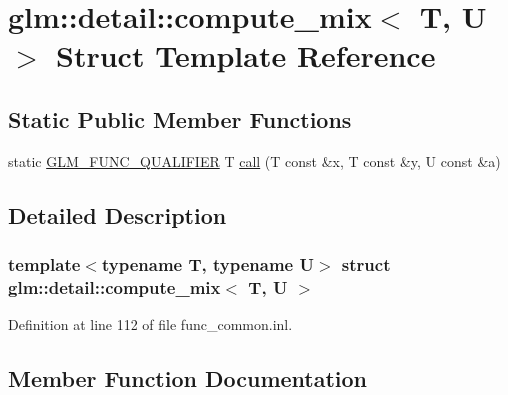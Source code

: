 \hypertarget{structglm_1_1detail_1_1compute__mix}{}\section{glm\+:\+:detail\+:\+:compute\+\_\+mix$<$ T, U $>$ Struct Template Reference}
\label{structglm_1_1detail_1_1compute__mix}
\subsection*{Static Public Member Functions}
\begin{DoxyCompactItemize}
\item 
static \hyperlink{setup_8hpp_a33fdea6f91c5f834105f7415e2a64407}{G\+L\+M\+\_\+\+F\+U\+N\+C\+\_\+\+Q\+U\+A\+L\+I\+F\+I\+ER} T \hyperlink{structglm_1_1detail_1_1compute__mix_a13fd963d8385f36486509a48fd68da1c}{call} (T const \&x, T const \&y, U const \&a)
\end{DoxyCompactItemize}


\subsection{Detailed Description}
\subsubsection*{template$<$typename T, typename U$>$\newline
struct glm\+::detail\+::compute\+\_\+mix$<$ T, U $>$}



Definition at line 112 of file func\+\_\+common.\+inl.



\subsection{Member Function Documentation}
\mbox{\label{structglm_1_1detail_1_1compute__mix_a13fd963d8385f36486509a48fd68da1c}} 
